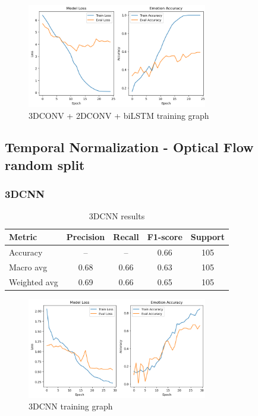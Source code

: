 \documentclass{article}
\begin{document}
\begin{figure}[H]
  \begin{center}
    \includegraphics*[width=0.7\textwidth]{Figures/Picture6.png}
  \end{center}
  \caption{3DCONV + 2DCONV + biLSTM training graph}
  \label{fig:fig6}
\end{figure}

\subsection{Temporal Normalization - Optical Flow random split}
\subsubsection{3DCNN}

\begin{table}[H]
\centering
\caption{3DCNN results}
\begin{tabular}{|l|c|c|c|c|}
\hline
\textbf{Metric} & \textbf{Precision} & \textbf{Recall} & \textbf{F1-score} & \textbf{Support} \\
\hline
Accuracy       & --   & --   & 0.66 & 105 \\
Macro avg      & 0.68 & 0.66 & 0.63 & 105 \\
Weighted avg   & 0.69 & 0.66 & 0.65 & 105 \\
\hline
\end{tabular}%
\label{tab:table3}
\end{table}

\begin{figure}[H]
  \begin{center}
    \includegraphics*[width=0.7\textwidth]{Figures/Picture7.png}
  \end{center}
  \caption{3DCNN training graph}
  \label{fig:fig7}
\end{figure}
\end{document}
